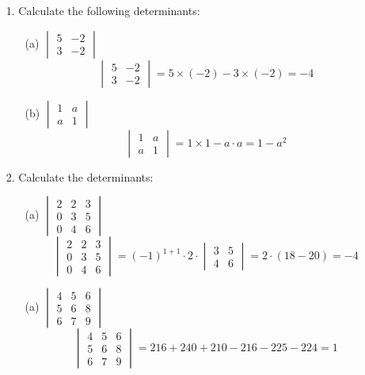 \documentclass{article}
\begin{document}
\begin{enumerate}
    \item[1. ] Calculate the following determinants:
        \begin{enumerate}
            \item[(a)] $\begin{vmatrix} 5 & -2 \\ 3 & -2 \end{vmatrix}$
            $$\begin{vmatrix} 5 & -2 \\ 3 & -2 \end{vmatrix} = 5 \times (-2) - 3 \times (-2) = -4$$
            \item[(b)] $\begin{vmatrix} 1 & a \\ a & 1 \end{vmatrix}$
            $$\begin{vmatrix} 1 & a \\ a & 1 \end{vmatrix} = 1 \times 1 - a \cdot a = 1-a^2$$
        \end{enumerate}
    
    \item[2. ] Calculate the determinants:
        \begin{enumerate}
            \item[(a)] $\begin{vmatrix} 2 & 2 & 3 \\ 0 & 3 & 5 \\ 0 & 4 & 6 \end{vmatrix}$
            $$\begin{vmatrix} 2 & 2 & 3 \\ 0 & 3 & 5 \\ 0 & 4 & 6 \end{vmatrix} = (-1)^{1+1}\cdot 2\cdot \begin{vmatrix}3 & 5 \\ 4 & 6 \end{vmatrix} = 2\cdot (18 - 20) = -4$$
            \item[(a)] $\begin{vmatrix} 4 & 5 & 6 \\ 5 & 6 & 8 \\ 6 & 7 & 9 \end{vmatrix}$
            $$\begin{vmatrix} 4 & 5 & 6 \\ 5 & 6 & 8 \\ 6 & 7 & 9 \end{vmatrix} = 216 + 240 + 210 - 216 - 225 - 224 = 1$$
        \end{enumerate}
    

\end{enumerate}
\end{document}
